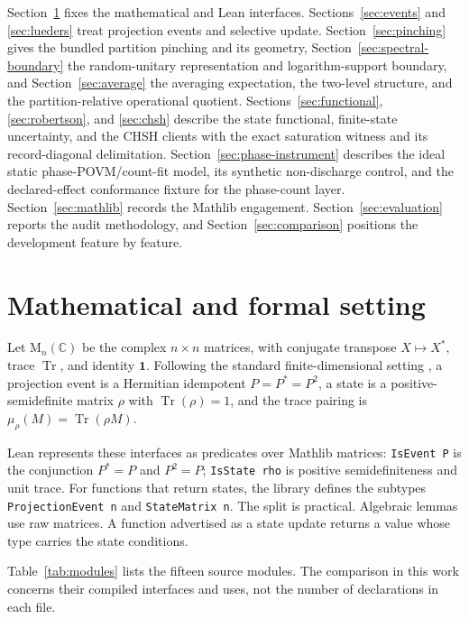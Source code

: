 \documentclass[11pt]{article}
\renewcommand{\_}{\textunderscore\allowbreak}
\theoremstyle{remark}
\newcommand{\C}{\mathbb C}
\newcommand{\Mn}{\mathrm{M}_n(\C)}
\newcommand{\Tr}{\operatorname{Tr}}
\newcommand{\one}{\mathbf 1}
\begin{document}
Section~\ref{sec:setting} fixes the mathematical and Lean interfaces.
Sections~\ref{sec:events} and \ref{sec:lueders} treat projection events and
selective update. Section~\ref{sec:pinching} gives the bundled partition
pinching and its geometry, Section~\ref{sec:spectral-boundary} the
random-unitary representation and logarithm-support boundary, and
Section~\ref{sec:average} the averaging
expectation, the two-level structure, and the partition-relative operational
quotient. Sections~\ref{sec:functional}, \ref{sec:robertson}, and
\ref{sec:chsh} describe the state functional, finite-state uncertainty, and
the CHSH clients with the exact saturation witness and its record-diagonal
delimitation. Section~\ref{sec:phase-instrument} describes the ideal static
phase-POVM/count-fit model, its synthetic non-discharge control, and the
declared-effect conformance fixture for the phase-count layer.
Section~\ref{sec:mathlib} records the Mathlib engagement.
Section~\ref{sec:evaluation} reports the audit methodology, and
Section~\ref{sec:comparison} positions the development feature by feature.

\section{Mathematical and formal setting}
\label{sec:setting}

Let $\Mn$ be the complex $n\times n$ matrices, with conjugate transpose
$X\mapsto X^*$, trace $\Tr$, and identity $\one$. Following the standard
finite-dimensional setting \cite{vonneumann1932}, a projection event is a
Hermitian idempotent $P=P^*=P^2$, a state is a positive-semidefinite matrix
$\rho$ with $\Tr(\rho)=1$, and the trace pairing is
$\mu_\rho(M)=\Tr(\rho M)$.

Lean represents these interfaces as predicates over Mathlib matrices:
\texttt{IsEvent P} is the conjunction $P^*=P$ and $P^2=P$;
\texttt{IsState rho} is positive semidefiniteness and unit trace. For
functions that return states, the library defines the subtypes
\texttt{ProjectionEvent n} and \texttt{StateMatrix n}. The split is
practical. Algebraic lemmas use raw matrices. A function advertised as a state
update returns a value whose type carries the state conditions.

Table~\ref{tab:modules} lists the fifteen source modules. The comparison in
this work concerns their compiled interfaces and uses, not the number of
declarations in each file.
\end{document}
